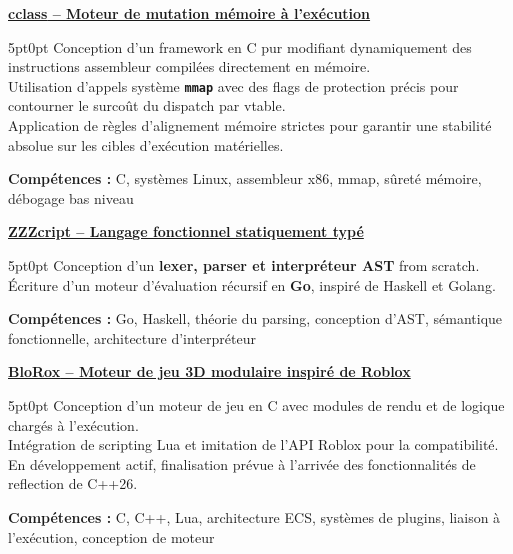\documentclass[9pt]{extarticle}
\begin{document}
\underline{\bfseries \href{https://github.com/paulogarithm/cclass}{cclass} -- Moteur de mutation mémoire à l'exécution}
\par
\begin{adjustwidth}{5pt}{0pt}
    Conception d'un framework en C pur modifiant dynamiquement des instructions assembleur compilées directement en mémoire. \\
    Utilisation d'appels système {\bfseries \texttt{mmap}} avec des flags de protection précis pour contourner le surcoût du dispatch par vtable. \\
    Application de règles d'alignement mémoire strictes pour garantir une stabilité absolue sur les cibles d'exécution matérielles.
\end{adjustwidth}
\par
{\bfseries Compétences :} C, systèmes Linux, assembleur x86, mmap, sûreté mémoire, débogage bas niveau

\par\vspace{8pt}

\underline{\bfseries \href{https://github.com/paulogarithm/zzzcript}{ZZZcript} -- Langage fonctionnel statiquement typé}
\par
\begin{adjustwidth}{5pt}{0pt}
	Conception d'un {\bfseries lexer, parser et interpréteur AST} from scratch. \\
	Écriture d'un moteur d'évaluation récursif en {\bfseries Go}, inspiré de Haskell et Golang.
\end{adjustwidth}
\par
{\bfseries Compétences :} Go, Haskell, théorie du parsing, conception d'AST, sémantique fonctionnelle, architecture d'interpréteur

\par\vspace{8pt}

\underline{\bfseries \href{https://github.com/paulogarithm/blorox}{BloRox} -- Moteur de jeu 3D modulaire inspiré de Roblox}
\par
\begin{adjustwidth}{5pt}{0pt}
	Conception d'un moteur de jeu en C avec modules de rendu et de logique chargés à l'exécution. \\
	Intégration de scripting Lua et imitation de l'API Roblox pour la compatibilité. \\
	En développement actif, finalisation prévue à l'arrivée des fonctionnalités de reflection de C++26.
\end{adjustwidth}
\par
{\bfseries Compétences :} C, C++, Lua, architecture ECS, systèmes de plugins, liaison à l'exécution, conception de moteur
\end{document}
